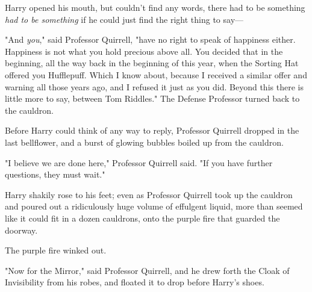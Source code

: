 Harry opened his mouth, but couldn't find any words, there had to be something 
\emph{had to be something} if he could just find the right thing to say---

"And \emph{you}," said Professor Quirrell, "have no right to speak of happiness 
either. Happiness is not what you hold precious above all. You decided that in 
the beginning, all the way back in the beginning of this year, when the Sorting 
Hat offered you Hufflepuff. Which I know about, because I received a similar 
offer and warning all those years ago, and I refused it just as you did. Beyond 
this there is little more to say, between Tom Riddles." The Defense Professor 
turned back to the cauldron.

Before Harry could think of any way to reply, Professor Quirrell dropped in the 
last bellflower, and a burst of glowing bubbles boiled up from the cauldron.

"I believe we are done here," Professor Quirrell said. "If you have further 
questions, they must wait."

Harry shakily rose to his feet; even as Professor Quirrell took up the cauldron 
and poured out a ridiculously huge volume of effulgent liquid, more than seemed 
like it could fit in a dozen cauldrons, onto the purple fire that guarded the 
doorway.

The purple fire winked out.

"Now for the Mirror," said Professor Quirrell, and he drew forth the Cloak of 
Invisibility from his robes, and floated it to drop before Harry's shoes.

